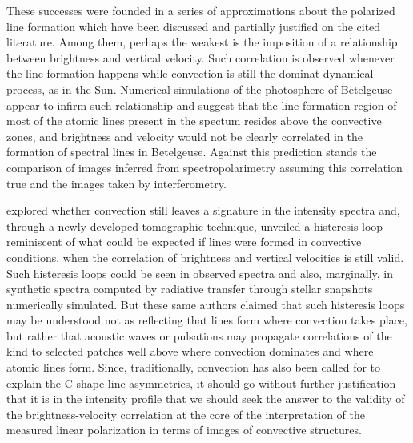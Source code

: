\documentclass{/Users/art2/TeX/aanda/aa}
\begin{document}
These successes were founded in a series of approximations about the polarized line formation which have been discussed and partially justified 
on the cited literature. Among them, perhaps the weakest is the imposition of a relationship between brightness and vertical velocity. Such correlation 
is observed whenever the line formation happens while convection is still the dominat dynamical process, as in the Sun. Numerical simulations of the 
photosphere of Betelgeuse appear to infirm such relationship and suggest that the line formation region of most of the atomic lines present in 
the spectum resides above the convective zones, and brightness 
and velocity would not be clearly correlated in the formation of spectral lines in Betelgeuse. Against this prediction stands the comparison of 
images inferred from spectropolarimetry assuming this correlation true and the images taken by interferometry. 

\cite{kravchenko_tomography_2018} explored whether convection still leaves a signature in the intensity spectra and, through a newly-developed tomographic technique, unveiled 
a histeresis loop reminiscent of what could be expected if lines were formed in convective conditions, when the correlation of brightness and 
vertical velocities is still valid. Such histeresis loops could be seen in observed spectra and also, marginally, in synthetic spectra computed 
by radiative transfer through stellar snapshots  numerically simulated. But these same authors claimed that such histeresis loops may be understood 
not as reflecting that lines form where convection takes place, but rather that acoustic waves or pulsations may propagate correlations of the 
kind to selected patches well above where convection dominates and where atomic lines form. 
Since, traditionally, convection has also been called for to explain the C-shape line asymmetries, it should go without further justification that 
it is in the intensity profile that we should seek the answer to the validity of the brightness-velocity correlation at the core of the interpretation
of the measured linear polarization in terms of images of convective structures. 
\end{document}
